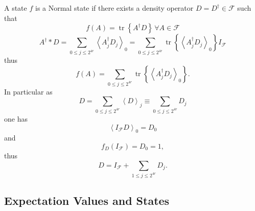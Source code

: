 \documentclass[aps,preprint]{revtex4}%
\begin{document}
A state $f$ is a Normal state if there exists a density operator
$D=D^{\dagger}\in\mathcal{F}$ such that
\begin{equation}
f\left(  A\right)  =\operatorname*{tr}\left\{  A^{\dagger}D\right\}  \,\forall
A\in\mathcal{F}%
\end{equation}%
\begin{equation}
A^{\dagger}\ast D=\sum_{0\leq j\leq2^{4r}}\left\langle A_{j}^{\dagger}%
D_{j}\right\rangle _{0}=\sum_{0\leq j\leq2^{4r}}\operatorname*{tr}\left\{
\left\langle A_{j}^{\dagger}D_{j}\right\rangle _{0}\right\}  I_{\mathcal{F}}%
\end{equation}
thus
\begin{equation}
f\left(  A\right)  =\sum_{0\leq j\leq2^{4r}}\operatorname*{tr}\left\{
\left\langle A_{j}^{\dagger}D_{j}\right\rangle _{0}\right\}  .
\end{equation}
In particular as
\begin{equation}
D=\sum_{0\leq j\leq2^{4r}}\left\langle D\right\rangle _{j}\equiv\sum_{0\leq
j\leq2^{4r}}D_{j}%
\end{equation}
one has%
\begin{equation}
\left\langle I_{\mathcal{F}}D\right\rangle _{0}=D_{0}%
\end{equation}
and
\begin{equation}
f_{D}\left(  I_{\mathcal{F}}\right)  =D_{0}=1,
\end{equation}
thus
\begin{equation}
D=I_{\mathcal{F}}+\sum_{1\leq j\leq2^{4r}}D_{j}.
\end{equation}


\subsection{Expectation Values and States}
\end{document}
